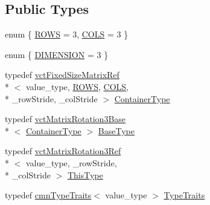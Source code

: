 \subsection*{Public Types}
\begin{DoxyCompactItemize}
\item 
enum \{ \hyperlink{classvct_matrix_rotation3_ref_ad8b09a8996d8d39c1a4e6d1d1143d5d5a11813f4600989202aee03ee7754ab0d1}{R\-O\-W\-S} = 3, 
\hyperlink{classvct_matrix_rotation3_ref_ad8b09a8996d8d39c1a4e6d1d1143d5d5a0fcc4856678937e7ae2094a9d06b05e5}{C\-O\-L\-S} = 3
 \}
\item 
enum \{ \hyperlink{classvct_matrix_rotation3_ref_a0eeec6fc7124d73c9d025d98c3f17b9fab44a8c65e2884fa5d2b3c6a92aa23b2e}{D\-I\-M\-E\-N\-S\-I\-O\-N} = 3
 \}
\item 
typedef \hyperlink{classvct_fixed_size_matrix_ref}{vct\-Fixed\-Size\-Matrix\-Ref}\\*
$<$ value\-\_\-type, \hyperlink{classvct_matrix_rotation3_ref_ad8b09a8996d8d39c1a4e6d1d1143d5d5a11813f4600989202aee03ee7754ab0d1}{R\-O\-W\-S}, \hyperlink{classvct_matrix_rotation3_ref_ad8b09a8996d8d39c1a4e6d1d1143d5d5a0fcc4856678937e7ae2094a9d06b05e5}{C\-O\-L\-S}, \\*
\-\_\-row\-Stride, \-\_\-col\-Stride $>$ \hyperlink{classvct_matrix_rotation3_ref_acf072a6c67950bf0621787114bb016b4}{Container\-Type}
\item 
typedef \hyperlink{classvct_matrix_rotation3_base}{vct\-Matrix\-Rotation3\-Base}\\*
$<$ \hyperlink{classvct_matrix_rotation3_ref_acf072a6c67950bf0621787114bb016b4}{Container\-Type} $>$ \hyperlink{classvct_matrix_rotation3_ref_a6710fec4e5d3c1a4f8f376293b1f30dd}{Base\-Type}
\item 
typedef \hyperlink{classvct_matrix_rotation3_ref}{vct\-Matrix\-Rotation3\-Ref}\\*
$<$ value\-\_\-type, \-\_\-row\-Stride, \\*
\-\_\-col\-Stride $>$ \hyperlink{classvct_matrix_rotation3_ref_aa4f99a97ebf5b94d4030335f45c91966}{This\-Type}
\item 
typedef \hyperlink{classcmn_type_traits}{cmn\-Type\-Traits}$<$ value\-\_\-type $>$ \hyperlink{classvct_matrix_rotation3_ref_a1627d01cd92c60b2a20b920593015948}{Type\-Traits}
\end{DoxyCompactItemize}
